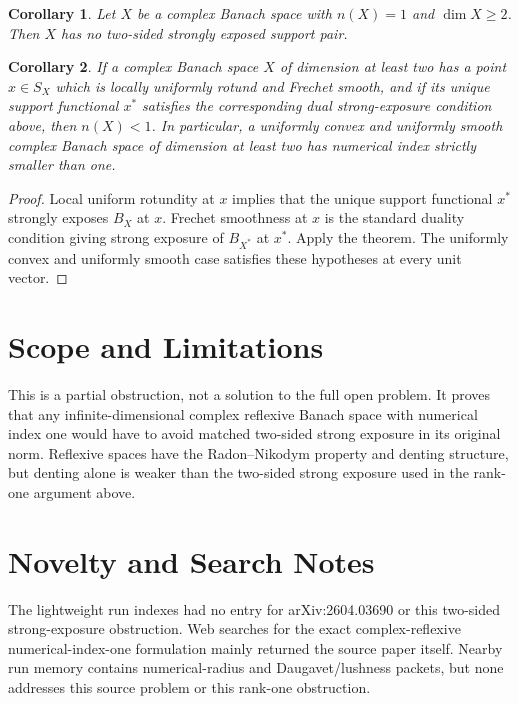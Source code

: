 \documentclass[11pt]{article}
\newtheorem{corollary}{Corollary}
\begin{document}
\begin{corollary}
Let $X$ be a complex Banach space with $n(X)=1$ and $\dim X\ge 2$.  Then $X$ has no two-sided strongly exposed support pair.
\end{corollary}

\begin{corollary}
If a complex Banach space $X$ of dimension at least two has a point $x\in S_X$ which is locally uniformly rotund and Frechet smooth, and if its unique support functional $x^*$ satisfies the corresponding dual strong-exposure condition above, then $n(X)<1$.  In particular, a uniformly convex and uniformly smooth complex Banach space of dimension at least two has numerical index strictly smaller than one.
\end{corollary}

\begin{proof}
Local uniform rotundity at $x$ implies that the unique support functional $x^*$ strongly exposes $B_X$ at $x$.  Frechet smoothness at $x$ is the standard duality condition giving strong exposure of $B_{X^*}$ at $x^*$.  Apply the theorem.  The uniformly convex and uniformly smooth case satisfies these hypotheses at every unit vector.
\end{proof}

\section*{Scope and Limitations}

This is a partial obstruction, not a solution to the full open problem.  It proves that any infinite-dimensional complex reflexive Banach space with numerical index one would have to avoid matched two-sided strong exposure in its original norm.  Reflexive spaces have the Radon--Nikodym property and denting structure, but denting alone is weaker than the two-sided strong exposure used in the rank-one argument above.

\section*{Novelty and Search Notes}

The lightweight run indexes had no entry for arXiv:2604.03690 or this two-sided strong-exposure obstruction.  Web searches for the exact complex-reflexive numerical-index-one formulation mainly returned the source paper itself.  Nearby run memory contains numerical-radius and Daugavet/lushness packets, but none addresses this source problem or this rank-one obstruction.
\end{document}
